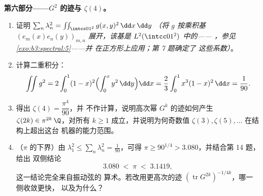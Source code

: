 \begin{problem}
\medskip
\noindent\textbf{第六部分——$G^2$ 的迹与
$\zeta(4)$。}
\begin{enumerate}[resume]
  \item 证明 $\sum_n\lambda_n^2 =
        \iint_{\intcc01^2}g(x,y)^2\,\dd x\,\dd y$
        \emph{（将 $g$ 按乘积基
        $(e_m(x)e_n(y))_{m,n}$ 展开，该基是 $L^2(\intcc01^2)$ 中的——
        ，参见\cref{exo:b3:spectral:5}——并
        在正方形上应用；第 7 题确定了
        这些系数）}。
  \item 计算二重积分：
        \[
        \iint g^2 = 2\int_0^1(1-x)^2\Bigl(\int_0^x
        y^2\,\dd y\Bigr)\dd x
        = \frac23\int_0^1x^3(1-x)^2\,\dd x = \frac1{90} .
        \]
  \item 得出 $\zeta(4) = \dfrac{\pi^4}{90}$，并
        不作计算，说明高次幂
        $G^k$ 的迹如何产生 $\zeta(2k) \in \pi^{2k}\,\Q$，对所有
        $k \geq 1$ 成立，并说明为何奇数值 $\zeta(3),
        \zeta(5), \dots$ 在结构上超出这台
        机器的能力范围。
  \item （$\pi$ 的下界）由 $\lambda_1^2 \leq
        \sum_n\lambda_n^2 = \frac1{90}$，可得 $\pi \geq
        90^{1/4} > 3.080$，并结合第 14 题，给出
        双侧结论
        \[
        3.080 \;<\; \pi \;<\; 3.1419,
        \]
        这一结论完全来自振动弦的
        算术。若改用更高次的迹
        $(\operatorname{tr}G^{2k})^{-1/4k}$，哪一侧收敛更快，
        以及为什么？
\end{enumerate}


\end{problem}
